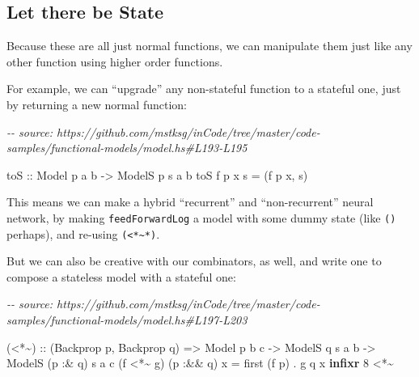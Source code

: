 \documentclass[]{article}
\newenvironment{Shaded}{}{}
\newcommand{\CommentTok}[1]{\textcolor[rgb]{0.38,0.63,0.69}{\textit{#1}}}
\newcommand{\DataTypeTok}[1]{\textcolor[rgb]{0.56,0.13,0.00}{#1}}
\newcommand{\DecValTok}[1]{\textcolor[rgb]{0.25,0.63,0.44}{#1}}
\newcommand{\KeywordTok}[1]{\textcolor[rgb]{0.00,0.44,0.13}{\textbf{#1}}}
\newcommand{\NormalTok}[1]{#1}
\newcommand{\OperatorTok}[1]{\textcolor[rgb]{0.40,0.40,0.40}{#1}}
\newcommand{\OtherTok}[1]{\textcolor[rgb]{0.00,0.44,0.13}{#1}}
\begin{document}
\subsection{Let there be State}\label{let-there-be-state}

Because these are all just normal functions, we can manipulate them just like
any other function using higher order functions.

For example, we can ``upgrade'' any non-stateful function to a stateful one,
just by returning a new normal function:

\begin{Shaded}
\begin{Highlighting}[]
\CommentTok{{-}{-} source: https://github.com/mstksg/inCode/tree/master/code{-}samples/functional{-}models/model.hs\#L193{-}L195}

\OtherTok{toS ::} \DataTypeTok{Model}\NormalTok{  p   a b}
    \OtherTok{{-}\textgreater{}} \DataTypeTok{ModelS}\NormalTok{ p s a b}
\NormalTok{toS f p x s }\OtherTok{=}\NormalTok{ (f p x, s)}
\end{Highlighting}
\end{Shaded}

This means we can make a hybrid ``recurrent'' and ``non-recurrent'' neural
network, by making \texttt{feedForwardLog\textquotesingle{}} a model with some
dummy state (like \texttt{()} perhaps), and re-using
\texttt{(\textless{}*\textasciitilde{}*)}.

But we can also be creative with our combinators, as well, and write one to
compose a stateless model with a stateful one:

\begin{Shaded}
\begin{Highlighting}[]
\CommentTok{{-}{-} source: https://github.com/mstksg/inCode/tree/master/code{-}samples/functional{-}models/model.hs\#L197{-}L203}

\NormalTok{(}\OperatorTok{\textless{}*\textasciitilde{}}\NormalTok{)}
\OtherTok{  ::}\NormalTok{ (}\DataTypeTok{Backprop}\NormalTok{ p, }\DataTypeTok{Backprop}\NormalTok{ q)}
    \OtherTok{=\textgreater{}} \DataTypeTok{Model}\NormalTok{   p         b c}
    \OtherTok{{-}\textgreater{}} \DataTypeTok{ModelS}\NormalTok{       q  s a b}
    \OtherTok{{-}\textgreater{}} \DataTypeTok{ModelS}\NormalTok{ (p }\OperatorTok{:\&}\NormalTok{ q) s a c}
\NormalTok{(f }\OperatorTok{\textless{}*\textasciitilde{}}\NormalTok{ g) (p }\OperatorTok{:\&\&}\NormalTok{ q) x }\OtherTok{=}\NormalTok{ first (f p) }\OperatorTok{.}\NormalTok{ g q x}
\KeywordTok{infixr} \DecValTok{8} \OperatorTok{\textless{}*\textasciitilde{}}
\end{Highlighting}
\end{Shaded}
\end{document}
